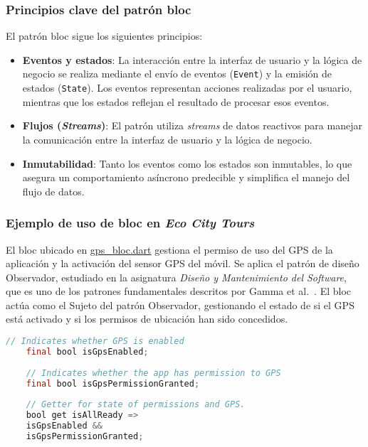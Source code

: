 \subsubsection{Principios clave del patrón \acrshort{bloc}}
	El patrón \acrfull{bloc} sigue los siguientes principios:
	\begin{itemize}
		\item \textbf{Eventos y estados}: La interacción entre la interfaz de usuario y la lógica de negocio se realiza mediante el envío de eventos (\texttt{Event}) y la emisión de estados (\texttt{State}). Los eventos representan acciones realizadas por el usuario, mientras que los estados reflejan el resultado de procesar esos eventos.
		\item \textbf{Flujos (\textit{Streams})}: El patrón utiliza \textit{streams} de datos reactivos para manejar la comunicación entre la interfaz de usuario y la lógica de negocio.
		\item \textbf{Inmutabilidad}: Tanto los eventos como los estados son inmutables, lo que asegura un comportamiento asíncrono predecible y simplifica el manejo del flujo de datos.
	\end{itemize}
	
\subsubsection{Ejemplo de uso de \acrshort{bloc} en \textit{Eco City Tours}}
El \acrshort{bloc} ubicado en \href{https://github.com/fps1001/TFGII_FPisot/tree/main/project-app/project_app/lib/blocs/gps/gps_bloc.dart}{gps\_bloc.dart} gestiona el permiso de uso del GPS de la aplicación y la activación del sensor GPS del móvil. 
Se aplica el patrón de diseño Observador, estudiado en la asignatura \textit{Diseño y Mantenimiento del Software}, que es uno de los patrones fundamentales descritos por Gamma et al.~\cite{gamma2002}.
El \acrshort{bloc} actúa como el Sujeto del patrón Observador, gestionando el estado de si el GPS está activado y si los permisos de ubicación han sido concedidos.

\begin{lstlisting}[language=Java, captionpos=b, frame=single, basicstyle=\ttfamily\footnotesize, caption={Definición de variables de control en el BLoC}, label={lst:bloc-variables}]
	// Indicates whether GPS is enabled
	final bool isGpsEnabled;
	
	// Indicates whether the app has permission to GPS
	final bool isGpsPermissionGranted;
	
	// Getter for state of permissions and GPS.
	bool get isAllReady =>
	isGpsEnabled &&
	isGpsPermissionGranted;
\end{lstlisting}


